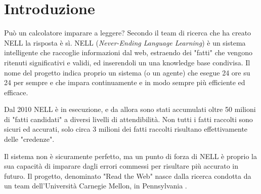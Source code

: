 \section*{Introduzione}
Può un calcolatore imparare a leggere? Secondo il team di ricerca che ha creato NELL la risposta è sì.\newline
NELL (\textit{Never-Ending Language Learning}) è un sistema intelligente che raccoglie informazioni dal web, estraendo dei "fatti" che vengono ritenuti significativi e validi, ed inserendoli un una knowledge base condivisa. Il nome del progetto indica proprio un sistema (o un agente) che esegue 24 ore su 24 per sempre e che impara continuamente e in modo sempre più efficiente ed efficace.

\noindent Dal 2010 NELL è in esecuzione, e da allora sono stati accumulati oltre 50 milioni di "fatti candidati" a diversi livelli di attendibilità.\newline
Non tutti i fatti raccolti sono sicuri ed accurati, solo circa 3 milioni dei fatti raccolti risultano effettivamente delle "credenze".

\noindent Il sistema non è sicuramente perfetto, ma un punto di forza di NELL è proprio la sua capacità di imparare dagli errori commessi per risultare più accurato in futuro.\newline
Il progetto, denominato "Read the Web" nasce dalla ricerca condotta da un team dell'Università Carnegie Mellon, in Pennsylvania \cite{ReadtheWeb:online}.

\newpage
